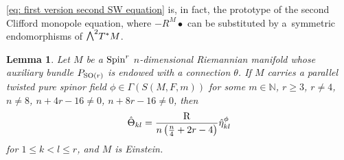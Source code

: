 \documentclass[10pt,a4paper]{amsart}
\newcommand{\ext}{\raise1pt\hbox{\small$\bigwedge$}}
\numberwithin{equation}{section}
\newtheorem{Lemma}[Theorem]{Lemma}
\begin{document}
\begin{Remark}\eqref{eq: first version second SW equation} is, in fact, the prototype of the second Clifford monopole equation,
where $-R^M\bullet$ can be substituted by a~symmetric endomorphisms of $\ext^2 T^*M$.
\end{Remark}

\begin{Lemma}\label{lemma: identity curvatures}Let $M$ be a ${\rm Spin}^r$ $n$-dimensional Riemannian manifold whose auxiliary bundle $P_{{\rm SO}(r)}$ is endowed with a connection $\theta$. If $M$ carries a parallel twisted pure spinor field $\phi\in\Gamma(S(M,F,m))$ for some $m\in\mathbb{N}$, $r\geq 3$, $r\not= 4$, $n\not=8$, $n+4r-16\not=0$, $n+8r-16\not=0$,
then
\begin{gather*}
\hat\Theta_{kl} = {{\rm R}\over n\left({n\over 4}+2r-4\right)}\hat\eta_{kl}^\phi
\end{gather*}
for $1\leq k<l\leq r$, and $M$ is Einstein.
\end{Lemma}
\end{document}
